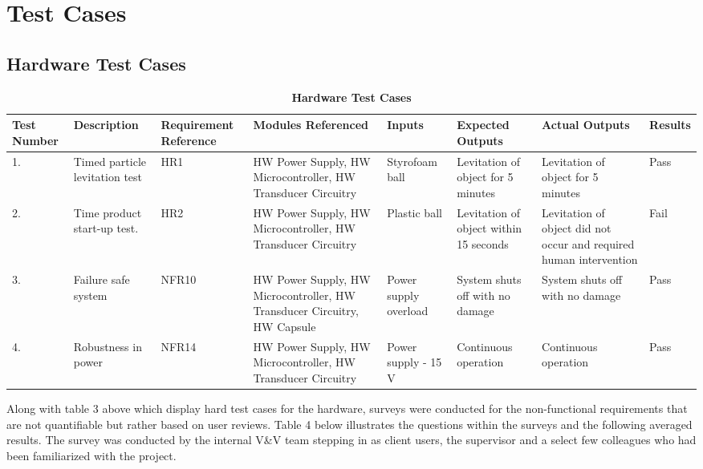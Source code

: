\documentclass[12pt, titlepage]{article}
\begin{document}
\hypertarget{Section5Anchor}{}

\section{Test Cases}
\subsection{Hardware Test Cases}

\begin{table}[H]
\caption{\bf Hardware Test Cases}
\begin{tabular}{ |p{1cm}|p{2.2cm}|p{2.4cm}|p{2cm}|p{1.7cm}|p{1.7cm}|p{1.7cm}|p{1.3cm}|  } 
 \hline
\bf Test Number & \bf Description & \bf Requirement Reference & \bf Modules Referenced & \bf Inputs & \bf Expected Outputs & \bf Actual Outputs & \bf Results\\
 \hline
 1. & Timed particle levitation test & HR1 & HW Power Supply, HW Microcontroller, HW Transducer Circuitry & Styrofoam ball & Levitation of object for 5 minutes & Levitation of object for 5 minutes & Pass\\
 \hline
 2. & Time product start-up test. & HR2 & HW Power Supply, HW Microcontroller, HW Transducer Circuitry & Plastic ball & Levitation of object within 15 seconds & Levitation of object did not occur and required human intervention& Fail\\
 \hline
 3. & Failure safe system & NFR10 & HW Power Supply, HW Microcontroller, HW Transducer Circuitry, HW Capsule & Power supply overload & System shuts off with no damage & System shuts off with no damage & Pass\\
 \hline 
 4. & Robustness in power & NFR14 & HW Power Supply, HW Microcontroller, HW Transducer Circuitry & Power supply - 15 V & Continuous operation & Continuous operation & Pass\\
 \hline 
\end{tabular}
\end{table}

Along with table 3 above which display hard test cases for the hardware, surveys were conducted for the non-functional requirements that are not quantifiable but rather based on user reviews. Table 4 below illustrates the questions within the surveys and the following averaged results. The survey was conducted by the internal V\&V team stepping in as client users, the supervisor and a select few colleagues who had been familiarized with the project.\\
\end{document}
